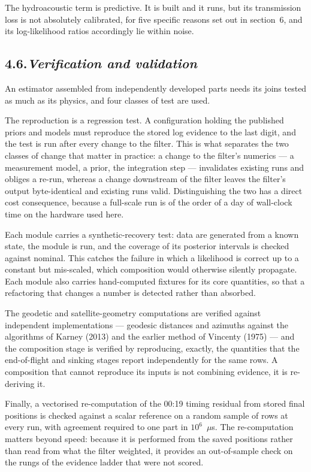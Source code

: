 \documentclass[12pt,a4paper]{article}
\begin{document}
The hydroacoustic term is predictive. It is built and it runs, but its transmission loss is not
absolutely calibrated, for five specific reasons set out in section~6, and its log-likelihood
ratios accordingly lie within noise.

\subsection*{4.6.\quad \textit{Verification and validation}}

An estimator assembled from independently developed parts needs its joins tested as much as its
physics, and four classes of test are used.

The reproduction is a regression test. A configuration holding the published priors and models
must reproduce the stored log evidence to the last digit, and the test is run after every change
to the filter. This is what separates the two classes of change that matter in practice: a change
to the filter's numerics --- a measurement model, a prior, the integration step --- invalidates
existing runs and obliges a re-run, whereas a change downstream of the filter leaves the
filter's output byte-identical and existing runs valid. Distinguishing the two has a direct cost
consequence, because a full-scale run is of the order of a day of wall-clock time on the hardware
used here.

Each module carries a synthetic-recovery test: data are generated from a known state, the module
is run, and the coverage of its posterior intervals is checked against nominal. This catches the
failure in which a likelihood is correct up to a constant but mis-scaled, which composition would
otherwise silently propagate. Each module also carries hand-computed fixtures for its core
quantities, so that a refactoring that changes a number is detected rather than absorbed.

The geodetic and satellite-geometry computations are verified against independent
implementations --- geodesic distances and azimuths against the algorithms of Karney (2013) and
the earlier method of Vincenty (1975) --- and the composition stage is verified by reproducing,
exactly, the quantities that the end-of-flight and sinking stages report independently for the
same rows. A composition that cannot reproduce its inputs is not combining evidence, it is
re-deriving it.

Finally, a vectorised re-computation of the 00:19 timing residual from stored final positions is
checked against a scalar reference on a random sample of rows at every run, with agreement
required to one part in $10^{6}$~$\mu$s. The re-computation matters beyond speed: because it is
performed from the saved positions rather than read from what the filter weighted, it provides an
out-of-sample check on the rungs of the evidence ladder that were not scored.
\end{document}
